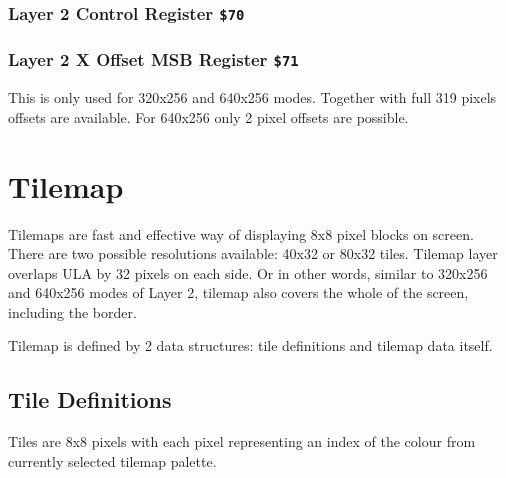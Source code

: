 \documentclass[12pt,twoside,openright,a4paper]{book}
\begin{document}
\subsubsection{Layer 2 Control Register {\tt \$70}}

\begin{NextPort}
\end{NextPort}


\subsubsection{Layer 2 X Offset MSB Register {\tt \$71}}

\begin{NextPort}
\end{NextPort}

This is only used for 320x256 and 640x256 modes. Together with  full 319 pixels offsets are available. For 640x256 only 2 pixel offsets are possible.


\pagebreak
\section{Tilemap}

Tilemaps are fast and effective way of displaying 8x8 pixel blocks on screen. There are two possible resolutions available: 40x32 or 80x32 tiles. Tilemap layer overlaps ULA by 32 pixels on each side. Or in other words, similar to 320x256 and 640x256 modes of Layer 2, tilemap also covers the whole of the screen, including the border.

Tilemap is defined by 2 data structures: tile definitions and tilemap data itself.


\subsection{Tile Definitions}

Tiles are 8x8 pixels with each pixel representing an index of the colour from currently selected tilemap palette.
\end{document}
